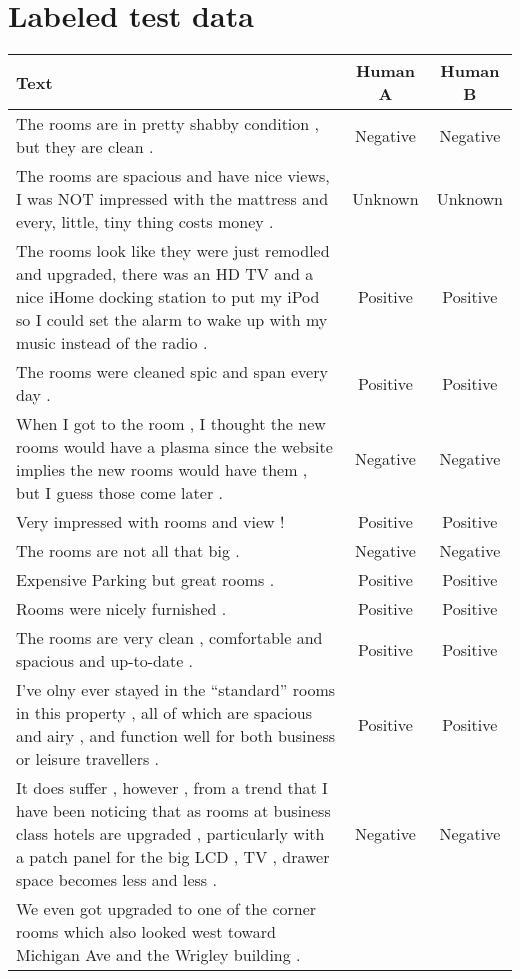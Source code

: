 \chapter{Labeled test data}
\label{chap:testData}

\begin{table}[f]
\begin{center}
\scriptsize
\begin{tabular}{m{8cm}cc}
Text & Human A & Human B \\
\hline\hline
The rooms are in pretty shabby condition , but they are clean . 
& Negative & Negative \\ \hline
The rooms are spacious and have nice views, I was NOT impressed with the mattress and every, little, tiny thing costs money . 
& Unknown & Unknown \\ \hline
The rooms look like they were just remodled and upgraded, there was an HD TV and a nice iHome docking station to put my iPod so I could set the alarm to wake up with my music instead of the radio .
& Positive & Positive \\ \hline
The rooms were cleaned spic and span every day .
& Positive & Positive \\ \hline
When I got to the room , I thought the new rooms would have a plasma since the website implies the new rooms would have them , but I guess those come later .
& Negative & Negative \\ \hline
Very impressed with rooms and view !
& Positive & Positive \\ \hline
The rooms are not all that big .
& Negative & Negative \\ \hline
Expensive Parking but great rooms .
& Positive & Positive \\ \hline
Rooms were nicely furnished .
& Positive & Positive \\ \hline
The rooms are very clean , comfortable and spacious and up-to-date .
& Positive & Positive \\ \hline
I've olny ever stayed in the ``standard'' rooms in this property , all of which are spacious and airy , and function well for both business or leisure travellers .
& Positive & Positive \\ \hline
It does suffer , however , from a trend that I have been noticing that as rooms at business class hotels are upgraded ,  particularly with a patch panel for the big LCD , TV , drawer space becomes less and less .
& Negative & Negative \\ \hline
We even got upgraded to one of the corner rooms which also looked west toward Michigan Ave and the Wrigley building .

\end{tabular}
\end{center}
\end{table}
